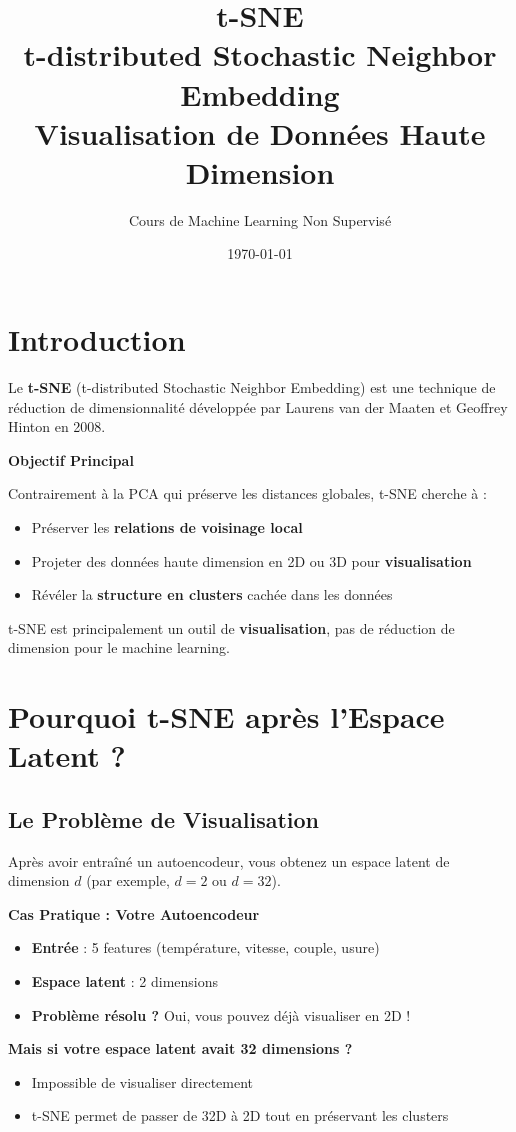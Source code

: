 \documentclass[a4paper,11pt]{article}
\title{\textbf{t-SNE} \\ \large t-distributed Stochastic Neighbor Embedding \\ Visualisation de Données Haute Dimension}
\author{Cours de Machine Learning Non Supervisé}
\date{\today}
\begin{document}
\maketitle
\tableofcontents
\newpage

\section{Introduction}

Le \textbf{t-SNE} (t-distributed Stochastic Neighbor Embedding) est une technique de réduction de dimensionnalité développée par Laurens van der Maaten et Geoffrey Hinton en 2008.

\begin{conceptbox}
\textbf{Objectif Principal}

Contrairement à la PCA qui préserve les distances globales, t-SNE cherche à :
\begin{itemize}
    \item Préserver les \textbf{relations de voisinage local}
    \item Projeter des données haute dimension en 2D ou 3D pour \textbf{visualisation}
    \item Révéler la \textbf{structure en clusters} cachée dans les données
\end{itemize}

t-SNE est principalement un outil de \textbf{visualisation}, pas de réduction de dimension pour le machine learning.
\end{conceptbox}

\section{Pourquoi t-SNE après l'Espace Latent ?}

\subsection{Le Problème de Visualisation}

Après avoir entraîné un autoencodeur, vous obtenez un espace latent de dimension $d$ (par exemple, $d=2$ ou $d=32$).

\begin{examplebox}
\textbf{Cas Pratique : Votre Autoencodeur}

\begin{itemize}
    \item \textbf{Entrée} : 5 features (température, vitesse, couple, usure)
    \item \textbf{Espace latent} : 2 dimensions
    \item \textbf{Problème résolu ?} Oui, vous pouvez déjà visualiser en 2D !
\end{itemize}

\textbf{Mais si votre espace latent avait 32 dimensions ?}
\begin{itemize}
    \item Impossible de visualiser directement
    \item t-SNE permet de passer de 32D à 2D tout en préservant les clusters
\end{itemize}
\end{examplebox}
\end{document}
